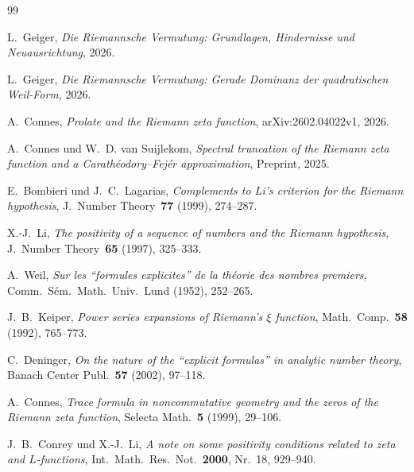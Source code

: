 \documentclass[12pt,a4paper]{article}
\theoremstyle{definition}
\theoremstyle{remark}
\begin{document}
\begin{thebibliography}{99}

L.~Geiger, \emph{Die Riemannsche Vermutung: Grundlagen, Hindernisse und Neuausrichtung}, 2026.

L.~Geiger, \emph{Die Riemannsche Vermutung: Gerade Dominanz der quadratischen Weil-Form}, 2026.

A.~Connes, \emph{Prolate and the Riemann zeta function}, arXiv:2602.04022v1, 2026.

A.~Connes und W.~D. van Suijlekom, \emph{Spectral truncation of the Riemann zeta function and a Carath\'eodory--Fej\'er approximation}, Preprint, 2025.

E.~Bombieri und J.~C.~Lagarias, \emph{Complements to Li's criterion for the Riemann hypothesis}, J.~Number Theory~\textbf{77} (1999), 274--287.

X.-J.~Li, \emph{The positivity of a sequence of numbers and the Riemann hypothesis}, J.~Number Theory~\textbf{65} (1997), 325--333.

A.~Weil, \emph{Sur les ``formules explicites'' de la th\'eorie des nombres premiers}, Comm.~S\'em.~Math.~Univ.~Lund (1952), 252--265.

J.~B.~Keiper, \emph{Power series expansions of Riemann's $\xi$ function}, Math.~Comp.~\textbf{58} (1992), 765--773.

C.~Deninger, \emph{On the nature of the ``explicit formulas'' in analytic number theory}, Banach Center Publ.~\textbf{57} (2002), 97--118.

A.~Connes, \emph{Trace formula in noncommutative geometry and the zeros of the Riemann zeta function}, Selecta Math.~\textbf{5} (1999), 29--106.

J.~B.~Conrey und X.-J.~Li, \emph{A note on some positivity conditions related to zeta and $L$-functions}, Int.~Math.~Res.~Not.~\textbf{2000}, Nr.~18, 929--940.

\end{thebibliography}
\end{document}
